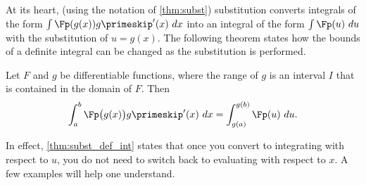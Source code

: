 At its heart, (using the notation of \autoref{thm:subst}) substitution converts integrals of the form $\int \Fp(g(x))g\primeskip'(x)\ dx$ into an integral of the form $\int \Fp(u)\ du$ with the substitution of $u = g(x)$. The following theorem states how the bounds of a definite integral can be changed as the substitution is performed.

\begin{theorem}\label{thm:subst_def_int}
Let $F$ and $g$ be differentiable functions, where the range of $g$ is an interval $I$ that is contained in the domain of $F$. Then 
\[\int_a^b \Fp\bigl(g(x)\bigr)g\primeskip'(x)\ dx = \int_{g(a)}^{g(b)} \Fp(u)\ du.\]
\end{theorem}

In effect, \autoref{thm:subst_def_int} states that once you convert to integrating with respect to $u$, you do not need to switch back to evaluating with respect to $x$. A few examples will help one understand.

